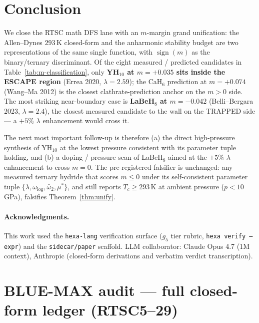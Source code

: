 \documentclass[11pt,a4paper]{article}
\begin{document}
\section{Conclusion}
\label{sec:conclusion}

We close the RTSC math DFS lane with an $m$-margin grand unification:
the Allen--Dynes $293$\,K closed-form and the anharmonic stability
budget are two representations of the same single function, with
$\operatorname{sign}(m)$ as the binary/ternary discriminant. Of the
eight measured / predicted candidates in
Table~\ref{tab:m-classification}, only \textbf{YH$_{10}$ at $m=+0.035$
sits inside the ESCAPE region} (Errea 2020, $\lambda=2.59$); the
CaH$_6$ prediction at $m=+0.074$ (Wang--Ma 2012) is the closest
clathrate-prediction anchor on the $m>0$ side. The most striking
near-boundary case is \textbf{LaBeH$_8$ at $m=-0.042$}
(Belli--Bergara 2023, $\lambda=2.4$), the closest measured candidate
to the wall on the TRAPPED side --- a $+5\%$ $\lambda$ enhancement
would cross it.

\medskip
\noindent The next most important
follow-up is therefore (a) the direct high-pressure synthesis
of YH$_{10}$ at the lowest pressure consistent with its parameter
tuple holding, and (b) a doping / pressure scan of LaBeH$_8$ aimed
at the $+5\%$ $\lambda$ enhancement to cross $m=0$. The pre-registered
falsifier is unchanged: any measured ternary hydride
that scores $m\leq 0$ under its self-consistent parameter tuple
$\{\lambda,\omega_{\log},\bar\omega_2,\mu^*\}$, and still reports
$T_c\geq 293$\,K at ambient pressure ($p<10$\,GPa),
falsifies Theorem~\ref{thm:unify}.

\paragraph{Acknowledgments.}
This work used the \texttt{hexa-lang} verification surface ($g_5$ tier
rubric, \texttt{hexa verify --expr}) and the \texttt{sidecar/paper}
scaffold. LLM collaborator: Claude Opus 4.7 (1M context), Anthropic
(closed-form derivations and verbatim verdict transcription).




\appendix

\section{BLUE-MAX audit --- full closed-form ledger (RTSC5--29)}
\label{app:blue-max}
\end{document}
